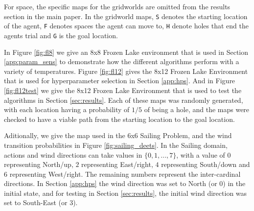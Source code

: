 \documentclass{article}
\theoremstyle{plain}
\begin{document}
\begin{appendices}
        For space, the specific maps for the gridworlds are omitted from the results section in the main paper. In the gridworld maps, \texttt{S} denotes the starting location of the agent, \texttt{F} denotes spaces the agent can move to, \texttt{H} denote holes that end the agents trial and \texttt{G} is the goal location. 
        
        In Figure \ref{fig:fl8} we give an 8x8 Frozen Lake environment that is used in Section \ref{app:param_sens} to demonstrate how the different algorithms perform with a variety of temperatures. Figure \ref{fig:fl12} gives the 8x12 Frozen Lake Environment that is used for hyperparameter selection in Section \ref{app:hps}. And in Figure \ref{fig:fl12test} we give the 8x12 Frozen Lake Environment that is used to test the algorithms in Section \ref{sec:results}. Each of these maps was randomly generated, with each location having a probability of $1/5$ of being a hole, and the maps were checked to have a viable path from the starting location to the goal location.

        Aditionally, we give the map used in the 6x6 Sailing Problem, and the wind transition probabilities in Figure \ref{fig:sailing_deets}. In the Sailing domain, actions and wind directions can take values in $\{0,1,...,7\}$, with a value of $0$ representing North/up, $2$ representing East/right, $4$ representing South/down and $6$ representing West/right. The remaining numbers represent the inter-cardinal directions. In Section \ref{app:hps} the wind direction was set to North (or $0$) in the initial state, and for testing in Section \ref{sec:results}, the initial wind direction was set to South-East (or $3$).
    

\end{appendices}
\end{document}
